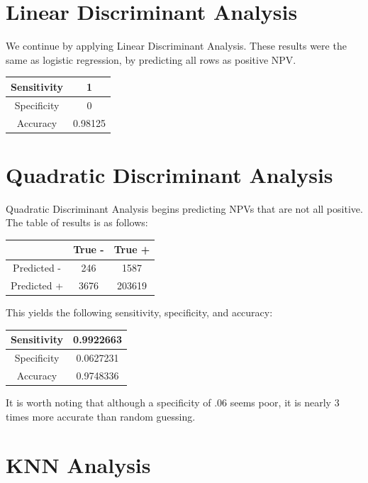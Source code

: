 \documentclass[10pt,twocolumn,letterpaper]{article}
\begin{document}
\section{Linear Discriminant Analysis}

We continue by applying Linear Discriminant Analysis. These results were the same as logistic regression, by predicting all rows as positive NPV. 
\begin{center}
	\begin{tabular}{ |c|c| } 
		\hline
		Sensitivity & 1 \\ 
		\hline
		Specificity & 0 \\
		\hline
		Accuracy & 0.98125\\ 
		\hline
	\end{tabular}
\end{center}

\section{Quadratic Discriminant Analysis}

Quadratic Discriminant Analysis begins predicting NPVs that are not all positive. The table of results is as follows:

\begin{center}
	\begin{tabular}{ |c|c|c| } 
		\hline
		 & True - & True +\\ 
		\hline
		Predicted - & 246 & 1587 \\ 
		\hline
		Predicted + & 3676 & 203619\\
		\hline
	\end{tabular}
\end{center}

This yields the following sensitivity, specificity, and accuracy:
\begin{center}
	\begin{tabular}{ |c|c| } 
		\hline
		Sensitivity & 0.9922663 \\ 
		\hline
		Specificity & 0.0627231 \\
		\hline
		Accuracy & 0.9748336\\ 
		\hline
	\end{tabular}
\end{center}

It is worth noting that although a specificity of .06 seems poor, it is nearly 3 times more accurate than random guessing.


\section{KNN Analysis}
\end{document}
